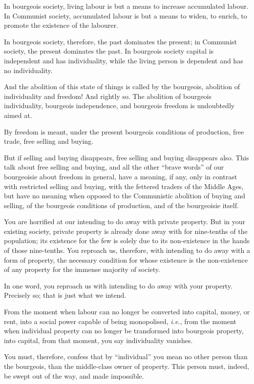 In bourgeois society, living labour is but a means to increase
accumulated labour. In Communist society, accumulated labour is but a
means to widen, to enrich, to promote the existence of the labourer.

In bourgeois society, therefore, the past dominates the present; in
Communist society, the present dominates the past. In bourgeois society
capital is independent and has individuality, while the living person
is dependent and has no individuality.

And the abolition of this state of things is called by the bourgeois,
abolition of individuality and freedom! And rightly so. The abolition
of bourgeois individuality, bourgeois independence, and bourgeois
freedom is undoubtedly aimed at.

By freedom is meant, under the present bourgeois conditions of
production, free trade, free selling and buying.

But if selling and buying disappears, free selling and buying
disappears also. This talk about free selling and buying, and all the
other \enquote{brave words} of our bourgeoisie about freedom in general, have a
meaning, if any, only in contrast with restricted selling and buying,
with the fettered traders of the Middle Ages, but have no meaning when
opposed to the Communistic abolition of buying and selling, of the
bourgeois conditions of production, and of the bourgeoisie itself.

You are horrified at our intending to do away with private property.
But in your existing society, private property is already done away
with for nine-tenths of the population; its existence for the few is
solely due to its non-existence in the hands of those nine-tenths. You
reproach us, therefore, with intending to do away with a form of
property, the necessary condition for whose existence is the
non-existence of any property for the immense majority of society.

In one word, you reproach us with intending to do away with your
property. Precisely so; that is just what we intend.

From the moment when labour can no longer be converted into capital,
money, or rent, into a social power capable of being monopolised,
\textit{i.e.}, from the moment when individual property can no longer be
transformed into bourgeois property, into capital, from that moment,
you say individuality vanishes.

You must, therefore, confess that by \enquote{individual} you mean no other
person than the bourgeois, than the middle-class owner of property.
This person must, indeed, be swept out of the way, and made impossible.

